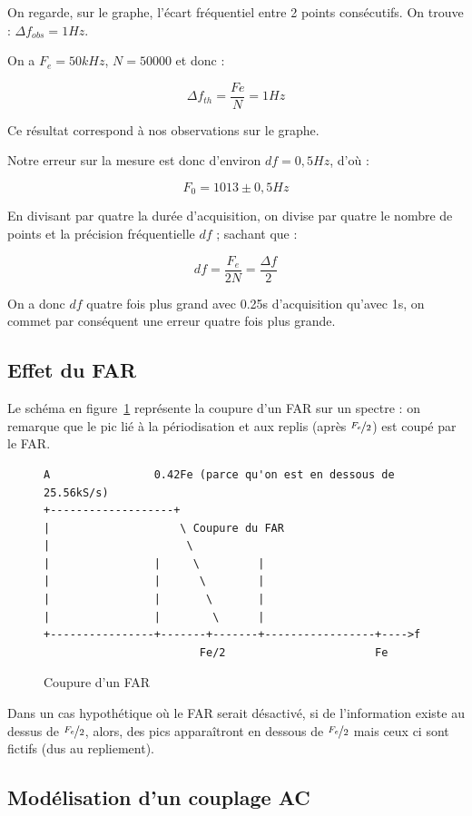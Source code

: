 \documentclass[11pt,a4paper]{article}
\begin{document}
On regarde, sur le graphe, l'écart fréquentiel entre 2 points consécutifs. On trouve : $\Delta f_{obs} = 1Hz$.

On a $F_e = 50kHz$, $N = 50000$ et donc :

$$\Delta f_{th} = \frac{Fe}{N} = 1Hz$$

Ce résultat correspond à nos observations sur le graphe.

Notre erreur sur la mesure est donc d'environ $df = 0,5Hz$, d'où :

$$F_0 = 1013\pm 0,5 Hz$$


En divisant par quatre la durée d'acquisition, on divise par quatre le nombre de points et la précision fréquentielle $df$ ; sachant que :

$$df  = \frac{F_e}{2N} = \frac{\Delta f}{2}$$

On a donc $df$ quatre fois plus grand avec 0.25s d'acquisition qu'avec 1s, on commet par conséquent une erreur quatre fois plus grande.

\subsection{Effet du FAR}

Le schéma en figure~\ref{FAR} représente la coupure d'un FAR sur un spectre : on remarque que le pic lié à la
périodisation et aux replis (après $\nicefrac{F_e}{2}$) est coupé par le FAR.

\begin{figure}[h!]
\begin{verbatim}
A                0.42Fe (parce qu'on est en dessous de 25.56kS/s)
+-------------------+
|                    \ Coupure du FAR
|                     \                      
|                |     \         |            
|                |      \        |            
|                |       \       |            
|                |        \      |            
+----------------+-------+-------+-----------------+---->f
                        Fe/2                       Fe
\end{verbatim}
\caption{\label{FAR}Coupure d'un FAR}
\end{figure}

Dans un cas hypothétique où le FAR serait désactivé, si de l'information existe au dessus de $\nicefrac{F_e}{2}$, alors, des pics apparaîtront en dessous
de $\nicefrac{F_e}{2}$ mais ceux ci sont fictifs (dus au repliement).

\subsection{Modélisation d'un couplage AC}
\end{document}
